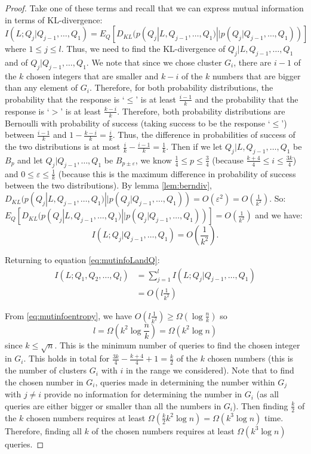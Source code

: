 \documentclass[12pt]{article}
\newcommand{\Om}{\Omega}
\begin{document}
\begin{proof}
Take one of these terms and recall that we can express mutual information in terms of KL-divergence:
$$I(L;Q_j|Q_{j-1},\ldots,Q_1) = E_Q [D_{KL}(p(Q_j|L,Q_{j-1},\ldots,Q_1)||p(Q_j|Q_{j-1},\ldots,Q_1))]$$ where $1 \leq j \leq l$. Thus, we need to find the KL-divergence of $Q_j|L,Q_{j-1},\ldots,Q_1$ and of $Q_j|Q_{j-1},\ldots,Q_1$. We note that since we chose cluster $G_i$, there are $i-1$ of the $k$ chosen integers that are smaller and $k-i$ of the $k$ numbers that are bigger than any element of $G_i$. Therefore, for both probability distributions, the probability that the response is `$\leq$' is at least $\frac{i-1}{k}$ and the probability that the response is `$>$' is at least $\frac{k-i}{k}$. Therefore, both probability distributions are Bernoulli with probability of success (taking success to be the response `$\leq$') between $\frac{i-1}{k}$ and $1-\frac{k-i}{k} = \frac{i}{k}$. Thus, the difference in probabilities of success of the two distributions is at most $\frac{i}{k} - \frac{i-1}{k} = \frac{1}{k}$. Then if we let $Q_j|L,Q_{j-1},\ldots,Q_1$ be $B_p$ and let $Q_j|Q_{j-1},\ldots,Q_1$ be $B_{p \pm \varepsilon}$, we know $\frac{1}{4} \leq p \leq \frac{3}{4}$ (because $\frac{k+4}{4} \leq i \leq \frac{3k}{4}$) and $0 \leq \varepsilon \leq \frac{1}{k}$ (because this is the maximum difference in probability of success between the two distributions). By lemma \ref{lem:berndiv}, $D_{KL}(p(Q_j|L,Q_{j-1},\ldots,Q_1)||p(Q_j|Q_{j-1},\ldots,Q_1)) = O(\varepsilon^2) = O(\frac{1}{k^2})$. So: $E_Q [D_{KL}(p(Q_j|L,Q_{j-1},\ldots,Q_1)||p(Q_j|Q_{j-1},\ldots,Q_1))] = O(\frac{1}{k^2})$ and we have: $$I(L;Q_j|Q_{j-1},\ldots,Q_1) = O\left(\frac{1}{k^2}\right).$$

Returning to equation \ref{eq:mutinfoLandQ}: 
\begin{align*}
I(L;Q_1, Q_2, \ldots, Q_l) &= \sum_{j=1}^l I(L;Q_j|Q_{j-1},\ldots,Q_1) \\
&= O\left(l \frac{1}{k^2}\right)
\end{align*}

From  \eqref{eq:mutinfoentropy}, we have $O(l \frac{1}{k^2}) \geq \Om(\log{\frac{n}{k}})$ so $$l = \Omega\left(k^2 \log{\frac{n}{k}}\right) = \Omega(k^2 \log{n})$$ since $k \leq \sqrt{n}$. This is the minimum number of queries to find the chosen integer in $G_i$. This holds in total for $\frac{3k}{4} - \frac{k + 4}{4} + 1= \frac{k}{2}$ of the $k$ chosen numbers (this is the number of clusters $G_i$ with $i$ in the range we considered). Note that to find the chosen number in $G_i$, queries made in determining the number within $G_j$ with $j \neq i$ provide no information for determining the number in $G_i$ (as all queries are either bigger or smaller than all the numbers in $G_i$). Then finding $\frac{k}{2}$ of the $k$ chosen numbers requires at least $\Omega\left(\frac{k}{2} k^2 \log{n}\right) = \Omega(k^3 \log{n})$ time. Therefore, finding all $k$ of the chosen numbers requires at least ${\Omega(k^3 \log{n})}$ queries. \qedhere
\end{proof}
\end{document}
